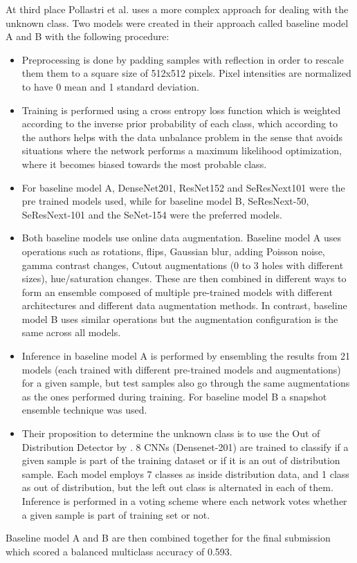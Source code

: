 At third place Pollastri et al. \cite{isic2019third} uses a more complex approach for dealing with the unknown class. Two models were created in their approach called baseline model A and B with the following procedure:
\begin{itemize}
    \item Preprocessing is done by padding samples with reflection in order to rescale them them to a square size of 512x512 pixels. Pixel intensities are normalized to have 0 mean and 1 standard deviation.
    \item Training is performed using a cross entropy loss function which is weighted according to the inverse prior probability of each class, which according to the authors helps with the data unbalance problem in the sense that avoids situations where the network performs a maximum likelihood optimization, where it becomes biased towards the most probable class. 
    \item For baseline model A, DenseNet201, ResNet152 and SeResNext101 were the pre trained models used, while for baseline model B, SeResNext-50, SeResNext-101 and the SeNet-154 were the preferred models.
    \item Both baseline models use online data augmentation. Baseline model A uses operations such as rotations, flips, Gaussian blur, adding Poisson noise, gamma contrast changes, Cutout augmentations \cite{cutout} (0 to 3 holes with different sizes), hue/saturation changes. These are then combined in different ways to form an ensemble composed of multiple pre-trained models with different architectures and different data augmentation methods. In contrast, baseline model B uses similar operations but the augmentation configuration is the same across all models.
    \item Inference in baseline model A is performed by ensembling the results from 21 models (each trained with different pre-trained models and augmentations) for a given sample, but test samples also go through the same augmentations as the ones performed during training. For baseline model B a snapshot ensemble technique \cite{snapshot} was used. 
    \item Their proposition to determine the unknown class is to use the Out of Distribution Detector by \cite{Vyas2018}. 8 CNNs (Densenet-201) are trained to classify if a given sample is part of the training dataset or if it is an out of distribution sample. Each model employs 7 classes as inside distribution data, and 1 class as out of distribution, but the left out class is alternated in each of them. Inference is performed in a voting scheme where each network votes whether a given sample is part of training set or not.
\end{itemize}
Baseline model A and B are then combined together for the final submission which scored a balanced multiclass accuracy of 0.593. \par 

